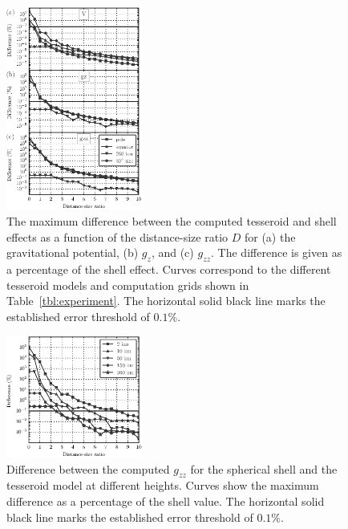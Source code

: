 \documentclass[paper,twocolumn,twoside]{geophysics}
\begin{document}
\begin{figure}
    \centering
    \includegraphics[width=0.4\textwidth]{figs/distance-size-curves}
    \caption{
        The maximum difference between the computed tesseroid and shell effects
        as a function of the distance-size ratio $D$
        for (a) the gravitational potential, (b) $g_z$, and (c) $g_{zz}$.
        The difference is given as a percentage of the shell effect.
        Curves correspond to the different tesseroid models and computation
        grids shown in Table~\ref{tbl:experiment}.
        The horizontal solid black line marks the established error threshold
        of $0.1\%$.
    }
    \label{fig:dist-size-curves}
\end{figure}

\begin{figure}
    \centering
    \includegraphics[width=0.4\textwidth]{figs/gzz-with-height}
    \caption{
        Difference between the computed $g_{zz}$ for the spherical shell and
        the tesseroid model at different heights. Curves show the maximum
        difference as a percentage of the shell value.
        The horizontal solid black line marks the established error threshold
        of $0.1\%$.
    }
    \label{fig:gzz-with-height}
\end{figure}
\end{document}
